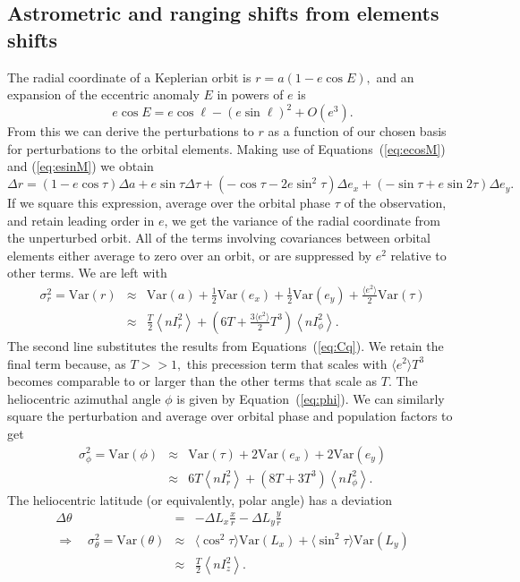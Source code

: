 \documentclass[linenumbers, onecolumn]{aastex631}
\newcommand{\eqq}[1]{Equation~(\ref{#1})}
\newcommand{\nIr}{\left\langle nI_r^2\right\rangle}
\newcommand{\nIphi}{\left\langle nI_\phi^2\right\rangle}
\newcommand{\nIz}{\left\langle nI_z^2\right\rangle}
\newcommand{\Var}{\textrm{Var}}
\newcommand{\ma}{\ell}  %
\begin{document}
 \subsection{Astrometric and ranging shifts from elements shifts}
\label{sec:observe}
The radial coordinate of a Keplerian orbit is $r=a(1-e\cos E),$ and an expansion of the eccentric anomaly $E$ in powers of $e$ is
\begin{equation}
  \label{eq:Ee2}
  e \cos E  =  e\cos \ma - (e \sin \ma)^2 + O(e^3).
\end{equation}
From this we can derive the perturbations to $r$ as a function of our chosen basis for perturbations to the orbital elements.  Making use of Equations~(\ref{eq:ecosM}) and (\ref{eq:esinM}) we obtain
\begin{equation}
  \Delta r = (1-e\cos\tau) \Delta a + e\sin\tau \Delta\tau +  (-\cos\tau -2e\sin^2\tau) \Delta e_x + (-\sin\tau+e\sin 2\tau) \Delta e_y.
\end{equation}
If we square this expression, average over the orbital phase $\tau$ of the observation, and retain leading order in $e$, we get the variance of the radial coordinate from the unperturbed orbit.  All of the terms involving covariances between orbital elements either average to zero over an orbit, or are suppressed by $e^2$ relative to other terms.  We are left with
\begin{eqnarray}
  \sigma^2_r = \Var(r) & \approx & \Var(a) + \frac{1}{2}\Var(e_x) + \frac{1}{2}\Var(e_y) + \frac{\langle e^2\rangle}{2} \Var(\tau) \\
          & \approx & \frac{T}{2} \nIr + \left( 6T + \frac{3\langle e^2 \rangle}{2} T^3\right) \nIphi.
                      \label{eq:varr}
\end{eqnarray}
The second line substitutes the results from Equations~(\ref{eq:Cq}).  We retain the final term because, as $T>>1,$ this precession term that scales with $\langle e^2 \rangle T^3$ becomes comparable to or larger than the other terms that scale as $T$.  
The heliocentric azimuthal angle $\phi$ is given by \eqq{eq:phi}.  We can similarly square the perturbation and average over orbital phase and population factors to get
\begin{eqnarray}
\sigma^2_\phi =   \Var(\phi) & \approx & \Var(\tau) + 2\Var(e_x) + 2\Var(e_y) \\
             & \approx & 6T\nIr + \left(8T+3T^3\right) \nIphi.
                         \label{eq:varphi}
\end{eqnarray}
The heliocentric latitude (or equivalently, polar angle) has a deviation
\begin{eqnarray}
  \Delta\theta & = & -\Delta L_x \frac{x}{r} - \Delta L_y \frac{y}{r} \\
  \Rightarrow \quad \sigma^2_\theta = \Var(\theta) & \approx & \langle\cos^2\tau\rangle \Var(L_x) + \langle\sin^2\tau\rangle \Var(L_y) \\
               & \approx & \frac{T}{2} \nIz.
                           \label{eq:vartheta}
\end{eqnarray}
\end{document}
